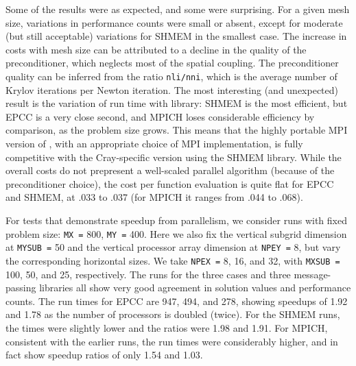 Some of the results were as expected, and some were surprising. For a given
mesh size, variations in performance counts were small or absent, except for
moderate (but still acceptable) variations for SHMEM in the smallest case.
The increase in costs with mesh size can be attributed to a decline in the
quality of the preconditioner, which neglects most of the spatial coupling.
The preconditioner quality can be inferred from the ratio {\tt nli/nni},
which is the average number of Krylov iterations per Newton iteration. The
most interesting (and unexpected) result is the variation of run time with
library: SHMEM is the most efficient, but EPCC is a very close second, and
MPICH loses considerable efficiency by comparison, as the problem size
grows. This means that the highly portable MPI version of {\cvode}, with an
appropriate choice of MPI implementation, is fully competitive with the
Cray-specific version using the SHMEM library. While the overall costs do
not prepresent a well-scaled parallel algorithm (because of the
preconditioner choice), the cost per function evaluation is quite flat for
EPCC and SHMEM, at .033 to .037 (for MPICH it ranges from .044 to .068).

For tests that demonstrate speedup from parallelism, we consider runs with
fixed problem size: {\tt MX =} 800, {\tt MY =} 400. Here we also fix the
vertical subgrid dimension at {\tt MYSUB =} 50 and the vertical processor
array dimension at {\tt NPEY =} 8, but vary the corresponding horizontal
sizes. We take {\tt NPEX =} 8, 16, and 32, with {\tt MXSUB =} 100, 50, and
25, respectively. The runs for the three cases and three message-passing
libraries all show very good agreement in solution values and performance
counts. The run times for EPCC are 947, 494, and 278, showing speedups of
1.92 and 1.78 as the number of processors is doubled (twice). For the SHMEM
runs, the times were slightly lower and the ratios were 1.98 and 1.91. For
MPICH, consistent with the earlier runs, the run times were considerably
higher, and in fact show speedup ratios of only 1.54 and 1.03.

